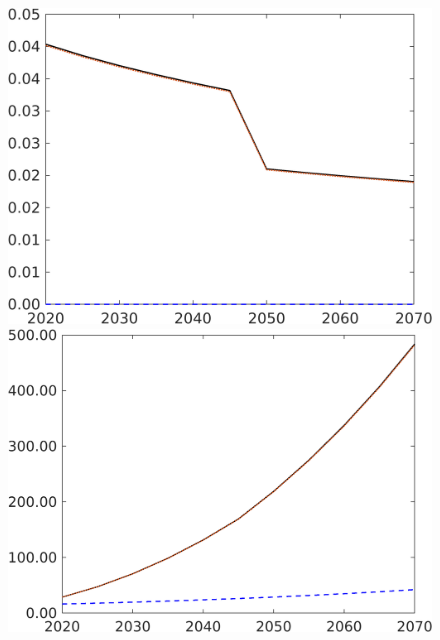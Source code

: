 \begin{figure}[h!!]
\begin{minipage}[]{0.32\textwidth}
	\end{minipage}
	\begin{minipage}[]{0.32\textwidth}
		\includegraphics[width=1\textwidth]{../../codding_model/own_basedOnFried/optimalPol_190722_tidiedUp/figures/all_10Aout22/CountMod1_target_sff_regime3_spillover0_sep1_extern0_PV1_etaa0.79_lgd0.png}
	\end{minipage}
	\begin{minipage}[]{0.32\textwidth}
		\includegraphics[width=1\textwidth]{../../codding_model/own_basedOnFried/optimalPol_190722_tidiedUp/figures/all_10Aout22/CountMod1_target_Ag_regime3_spillover0_sep1_extern0_PV1_etaa0.79_lgd0.png}

\end{minipage}
\end{figure}
